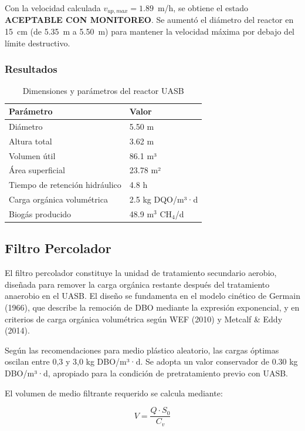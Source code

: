 \documentclass[12pt,a4paper]{article}
\begin{document}
Con la velocidad calculada $v_{up,max} = 1.89$~m/h, se obtiene el estado \textbf{ACEPTABLE CON MONITOREO}. Se aumentó el diámetro del reactor en 15~cm (de 5.35~m a 5.50~m) para mantener la velocidad máxima por debajo del límite destructivo.

\subsubsection{Resultados}

\begin{table}[H]
\centering
\caption{Dimensiones y parámetros del reactor UASB}
\begin{tabular}{ll}
\toprule
Parámetro & Valor \\
\midrule
Diámetro & 5.50 m \\
Altura total & 3.62 m \\
Volumen útil & 86.1 m³ \\
Área superficial & 23.78 m² \\
Tiempo de retención hidráulico & 4.8 h \\
Carga orgánica volumétrica & 2.5 kg DQO/m³·d \\
Biogás producido & 48.9 m$^3$ CH$_4$/d \\
\bottomrule
\end{tabular}
\end{table}

\subsection{Filtro Percolador}

El filtro percolador constituye la unidad de tratamiento secundario aerobio, diseñada para remover la carga orgánica restante después del tratamiento anaerobio en el UASB. El diseño se fundamenta en el modelo cinético de Germain (1966), que describe la remoción de DBO mediante la expresión exponencial, y en criterios de carga orgánica volumétrica según WEF (2010) y Metcalf \& Eddy (2014).

Según las recomendaciones para medio plástico aleatorio, las cargas óptimas oscilan entre 0,3 y 3,0 kg DBO/m³·d. Se adopta un valor conservador de 0.30 kg DBO/m³·d, apropiado para la condición de pretratamiento previo con UASB.

El volumen de medio filtrante requerido se calcula mediante:

\begin{equation}
V = \frac{Q \cdot S_0}{C_v}
\end{equation}
\end{document}
